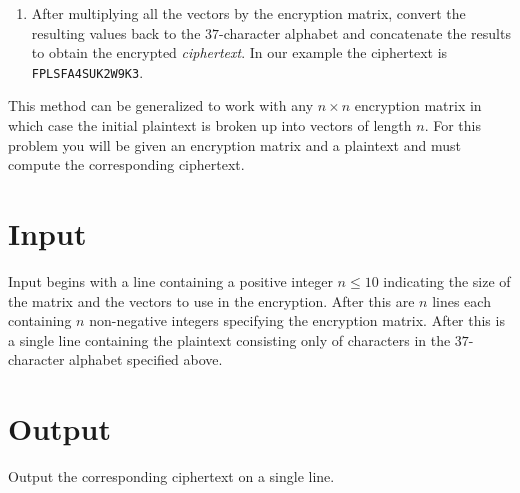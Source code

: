 \begin{enumerate}
\[\right)
\]
then the first vector is transformed as follows:
\begin{eqnarray*}
\left(
\begin{array}{ccc}
30 &  1 &  9 \\
 4 & 23 &  7 \\
 5 &  9 & 13
\end{array}
\right)
\left(
\begin{array}{c}
0 \\ 19 \\ 19
\end{array}
\right)
& = &
\left(
\begin{array}{c}
(30 \times 0 + 1 \times 19 + 9 \times 19) \mod 37 \\
(4 \times 0 + 23 \times 19 + 7 \times 19) \mod 37 \\
(5 \times 0 + 9 \times 19 + 13 \times 19) \mod 37
\end{array}
\right) \\
& = &
\left(
\begin{array}{c}
5 \\ 15 \\ 11
\end{array}
\right)
\end{eqnarray*}

\item After multiplying all the vectors by the encryption matrix, convert the resulting values back to the $37$-character alphabet and concatenate the results to obtain the encrypted {\em ciphertext}.  In our example the ciphertext is {\tt FPLSFA4SUK2W9K3}.
\end{enumerate}

This method can be generalized to work with any $n \times n$ encryption matrix in which case the initial plaintext is broken up into vectors of length $n$.  For this problem you will be given an encryption matrix and a plaintext and must compute
the corresponding ciphertext.

\section*{Input}
Input begins with a line containing a positive integer $n \leq 10$ indicating the size of the matrix and the vectors to use in the encryption.  After this are $n$ lines each containing $n$ non-negative integers specifying the encryption matrix. After this is a single line containing the plaintext consisting only of characters in the $37$-character alphabet specified above.

\section*{Output}
Output the corresponding ciphertext on a single line.
